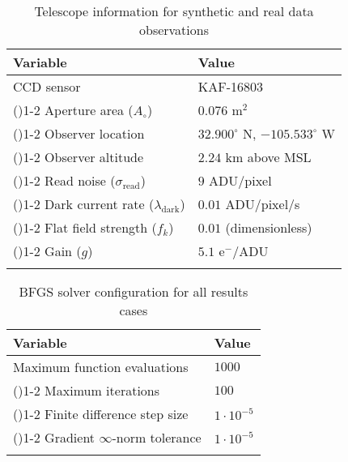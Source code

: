 \documentclass[a4paper,twocolumn]{spaceDebrisC} %
\newcommand{\grule}[0]{\arrayrulecolor{darkgray}\cmidrule(){1-2}}
\newcommand{\brule}[0]{\arrayrulecolor{black} \bottomrule}
\begin{document}
\begin{table}[H]
  \centering
  \renewcommand{\arraystretch}{1.3} %
  \caption{Telescope information for synthetic and real data observations}
  \vspace*{6pt}
  \begin{tabular}{@{} l l @{}}
    \toprule
    Variable & Value \\ \midrule
    CCD sensor & KAF-16803 \\ \grule
    Aperture area ($A_\circ$) & $0.076$ m$^2$ \\ \grule
    Observer location & $32.900^\circ$ N, $-105.533^\circ$ W \\ \grule
    Observer altitude & $2.24$ km above MSL \\ \grule
    Read noise ($\sigma_\text{read}$) & $9$ ADU/pixel \\ \grule
    Dark current rate ($\lambda_\text{dark}$) & $0.01$ ADU/pixel/s \\ \grule
    Flat field strength ($f_k$) & $0.01$ (dimensionless) \\ \grule
    Gain ($g$) & $5.1$ e$^-$/ADU \\ \brule
  \end{tabular}
  \label{tb:tele_info}
\end{table}

\begin{table}[H]
  \centering
  \renewcommand{\arraystretch}{1.3} %
  \caption{BFGS solver configuration for all results cases}
  \vspace*{6pt}
  \begin{tabular}{@{} l l @{}}
    \toprule
    Variable & Value \\ \midrule
    Maximum function evaluations & $1000$ \\ \grule
    Maximum iterations & $100$ \\ \grule
    Finite difference step size & $1 \cdot 10^{-5}$ \\ \grule
    Gradient $\infty$-norm tolerance & $1 \cdot 10^{-5}$ \\ \brule
  \end{tabular}
  \label{tb:bfgs_info}
\end{table}



\end{document}
